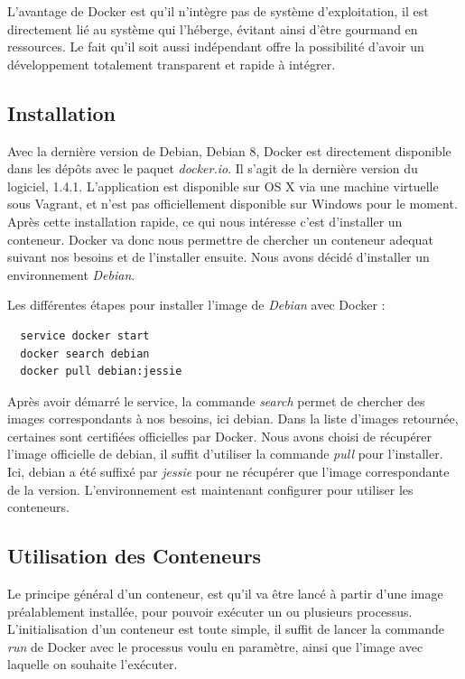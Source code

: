 \documentclass[12pt,a4paper]{article}
\begin{document}
L'avantage de Docker est qu'il n'intègre pas de système d'exploitation, il est directement lié au système qui l'héberge, évitant ainsi d'être gourmand en ressources. Le fait qu'il soit aussi indépendant offre la possibilité d'avoir un développement totalement transparent et rapide à intégrer. 

\subsection{Installation}
Avec la dernière version de Debian, Debian 8, Docker est directement disponible dans les dépôts avec le paquet \textit{docker.io}. Il s'agit de la dernière version du logiciel, 1.4.1. L'application est disponible sur OS X via une machine virtuelle sous Vagrant, et n'est pas officiellement disponible sur Windows pour le moment. Après cette installation rapide, ce qui nous intéresse c'est d'installer un conteneur. Docker va donc nous permettre de chercher un conteneur adequat suivant nos besoins et de l'installer ensuite. Nous avons décidé d'installer un environnement \textit{Debian}.

Les différentes étapes pour installer l'image de \textit{Debian} avec Docker :
\begin{lstlisting}
  service docker start
  docker search debian
  docker pull debian:jessie
\end{lstlisting}

Après avoir démarré le service, la commande \textit{search} permet de chercher des images correspondants à nos besoins, ici debian. Dans la liste d'images retournée, certaines sont certifiées officielles par Docker. Nous avons choisi de récupérer l'image officielle de debian, il suffit d'utiliser la commande \textit{pull} pour l'installer. Ici, debian a été suffixé par \textit{jessie} pour ne récupérer que l'image correspondante de la version. L'environnement est maintenant configurer pour utiliser les conteneurs.

\subsection{Utilisation des Conteneurs}

Le principe général d'un conteneur, est qu'il va être lancé à partir d'une image préalablement installée, pour pouvoir exécuter un ou plusieurs processus. L'initialisation d'un conteneur est toute simple, il suffit de lancer la commande \textit{run} de Docker avec le processus voulu en paramètre, ainsi que l'image avec laquelle on souhaite l'exécuter. 
\end{document}

